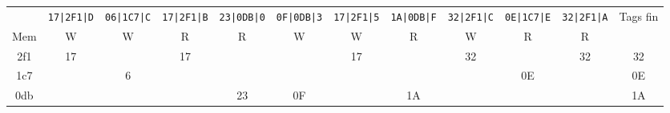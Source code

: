 \documentclass{article}
\begin{document}
\small
\begin{tabular}{c|*{10}{c}|c|}
	    & \verb$17|2F1|D$ & \verb$06|1C7|C$ & \verb$17|2F1|B$ & \verb$23|0DB|0$ & \verb$0F|0DB|3$ & \verb$17|2F1|5$ & \verb$1A|0DB|F$ & \verb$32|2F1|C$ & \verb$0E|1C7|E$ & \verb$32|2F1|A$ & Tags fin \\
	Mem & W               & W               & R               & R               & W               & W               & R               & W               & R               & R               &          \\ \hline
	2f1 & 17              &                 & 17              &                 &                 & 17              &                 & 32              &                 & 32              & 32       \\ \hline
	1c7 &                 & 6               &                 &                 &                 &                 &                 &                 & 0E              &                 & 0E       \\ \hline
	0db &                 &                 &                 & 23              & 0F              &                 & 1A              &                 &                 &                 & 1A       \\ \hline
\end{tabular}
\vspace{5mm}\\
\end{document}
